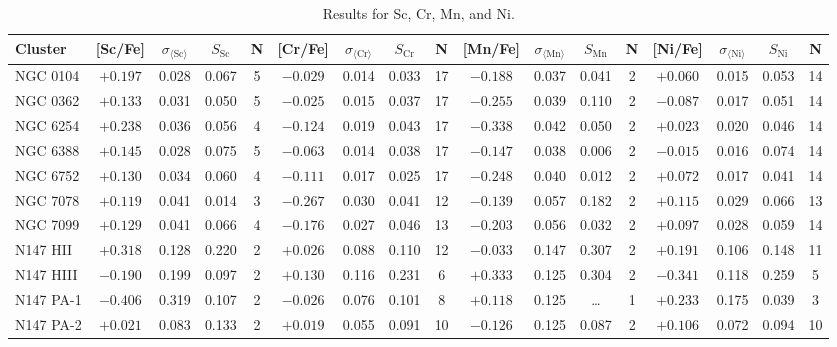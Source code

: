 \documentclass{aa}
\begin{document}
\begin{appendix}
\begin{table*}
\caption{Results for Sc, Cr, Mn, and Ni.}
\label{tab:results2}
\begin{adjustbox}{width=1\textwidth}
\centering
{\small
\begin{tabular}{l cccccccccccccccc}
\hline\hline
% 
Cluster       & [Sc/Fe] & $\sigma_{\langle\mathrm{Sc}\rangle}$ & $S_\mathrm{Sc}$ & N    & [Cr/Fe] & $\sigma_{\langle\mathrm{Cr}\rangle}$ & $S_\mathrm{Cr}$ & N     & [Mn/Fe] & $\sigma_{\langle\mathrm{Mn}\rangle}$ & $S_\mathrm{Mn}$ & N    & [Ni/Fe] & $\sigma_{\langle\mathrm{Ni}\rangle}$ & $S_\mathrm{Ni}$ & N    \\ \hline
NGC 0104      & $+0.197$ & 0.028 & 0.067 & 5 & $-0.029$ & 0.014 & 0.033 & 17 & $-0.188$ & 0.037 & 0.041 & 2 & $+0.060$ & 0.015 & 0.053 & 14 \\
NGC 0362      & $+0.133$ & 0.031 & 0.050 & 5 & $-0.025$ & 0.015 & 0.037 & 17 & $-0.255$ & 0.039 & 0.110 & 2 & $-0.087$ & 0.017 & 0.051 & 14 \\
NGC 6254      & $+0.238$ & 0.036 & 0.056 & 4 & $-0.124$ & 0.019 & 0.043 & 17 & $-0.338$ & 0.042 & 0.050 & 2 & $+0.023$ & 0.020 & 0.046 & 14 \\
NGC 6388      & $+0.145$ & 0.028 & 0.075 & 5 & $-0.063$ & 0.014 & 0.038 & 17 & $-0.147$ & 0.038 & 0.006 & 2 & $-0.015$ & 0.016 & 0.074 & 14 \\
NGC 6752      & $+0.130$ & 0.034 & 0.060 & 4 & $-0.111$ & 0.017 & 0.025 & 17 & $-0.248$ & 0.040 & 0.012 & 2 & $+0.072$ & 0.017 & 0.041 & 14 \\
NGC 7078      & $+0.119$ & 0.041 & 0.014 & 3 & $-0.267$ & 0.030 & 0.041 & 12 & $-0.139$ & 0.057 & 0.182 & 2 & $+0.115$ & 0.029 & 0.066 & 13 \\
NGC 7099      & $+0.129$ & 0.041 & 0.066 & 4 & $-0.176$ & 0.027 & 0.046 & 13 & $-0.203$ & 0.056 & 0.032 & 2 & $+0.097$ & 0.028 & 0.059 & 14 \\
N147 HII      & $+0.318$ & 0.128 & 0.220 & 2 & $+0.026$ & 0.088 & 0.110 & 12 & $-0.033$ & 0.147 & 0.307 & 2 & $+0.191$ & 0.106 & 0.148 & 11 \\
N147 HIII     & $-0.190$ & 0.199 & 0.097 & 2 & $+0.130$ & 0.116 & 0.231 & 6 & $+0.333$ & 0.125 & 0.304 & 2 & $-0.341$ & 0.118 & 0.259 & 5 \\
N147 PA-1     & $-0.406$ & 0.319 & 0.107 & 2 & $-0.026$ & 0.076 & 0.101 & 8 & $+0.118$ & 0.125 & \ldots & 1 & $+0.233$ & 0.175 & 0.039 & 3 \\
N147 PA-2     & $+0.021$ & 0.083 & 0.133 & 2 & $+0.019$ & 0.055 & 0.091 & 10 & $-0.126$ & 0.125 & 0.087 & 2 & $+0.106$ & 0.072 & 0.094 & 10 \\

\end{tabular}}
\end{adjustbox}
\end{table*}
\end{appendix}
\end{document}
